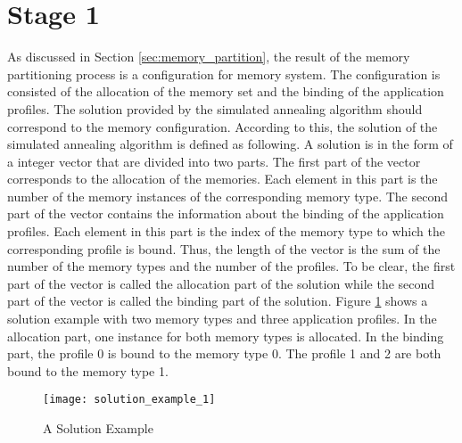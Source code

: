 	\section{Stage 1}
	\label{sec:stage_1}
	As discussed in Section \ref{sec:memory_partition}, the result of the memory
	partitioning process is a configuration for memory system. The configuration
	is consisted of the allocation of the memory set and the binding of the
	application profiles. The solution provided by the simulated annealing
	algorithm should correspond to the memory configuration. According to this,
	the solution of the simulated annealing algorithm is defined as following.
	A solution is in the form of a integer vector that are divided into two parts.
	The first part of the vector corresponds to the allocation of the memories.
	Each element in this part is the number of the memory instances of the
	corresponding memory type. The second part of the vector contains the
	information about the binding of the application profiles. Each element
	in this part is the index of the memory type to which the corresponding
	profile is bound. Thus, the length of the vector is the sum of the number
	of the memory types and the number of the profiles.
	To be clear, the first part of the vector is called the allocation part of
	the solution while the second part of the vector is called the binding part
	of the solution. Figure \ref{fig:solu_exam_1} shows a solution example
	with two memory types and three application profiles. In the allocation part,
	one instance for both memory types is allocated. In the binding part, the
	profile 0 is bound to the memory type 0. The profile 1 and 2 are both bound
	to the memory type 1.
	\begin{figure}[t]
		\begin{center}
			\texttt{[image: solution\_example\_1]}
			\caption{A Solution Example}
			\label{fig:solu_exam_1}
		\end{center}
	\end{figure}

